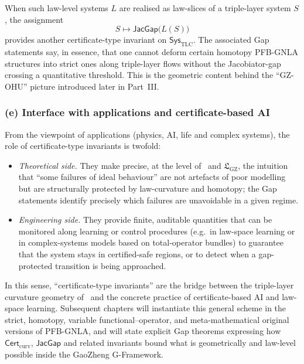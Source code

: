 \documentclass[11pt]{book}
\theoremstyle{plain}
\theoremstyle{definition}
\newcommand{\GZLS}{\ensuremath{\mathfrak{L}_{\mathrm{GZ}}}}       \newcommand{\GZLT}{\ensuremath{M_{!w}}}                           \newcommand{\GZLOC}{\ensuremath{A_M}}                             \newcommand{\GZLCurv}{\ensuremath{\mathcal{F}_{\mathrm{law}}}}
\begin{document}
When such law-level systems $L$ are realised as law-slices of a
triple-layer system $S$, the assignment
\[
   S \longmapsto \mathsf{JacGap}\bigl(L(S)\bigr)
\]
provides another certificate-type invariant on
$\mathsf{Sys}_{\mathrm{TLC}}$. The associated Gap statements say, in
essence, that one cannot deform certain homotopy PFB-GNLA structures
into strict ones along triple-layer flows without the Jacobiator-gap
crossing a quantitative threshold. This is the geometric content
behind the “GZ-OHU” picture introduced later in Part~III.



\subsubsection*{(e) Interface with applications and certificate-based AI}

From the viewpoint of applications (physics, AI, life and complex systems), the role of
certificate-type invariants is twofold:

\begin{itemize}
  \item \emph{Theoretical side.}
        They make precise, at the level of \GZTLC\ and \GZLS, the
        intuition that “some failures of ideal behaviour” are not
        artefacts of poor modelling but are structurally protected by
        law-curvature and homotopy; the Gap statements identify
        precisely which failures are unavoidable in a given regime.
  \item \emph{Engineering side.}
        They provide finite, auditable quantities that can be monitored
        along learning or control procedures (e.g.\ in law-space
        learning or in complex-systems models based on
        total-operator bundles) to guarantee
        that the system stays in certified-safe regions, or to detect
        when a gap-protected transition is being approached.
\end{itemize}

In this sense, “certificate-type invariants” are the bridge between the
triple-layer curvature geometry of \GZTLC\ and the concrete practice of
certificate-based AI and law-space learning. Subsequent chapters will
instantiate this general scheme in the strict, homotopy, variable
functional–operator, and meta-mathematical original versions of
PFB-GNLA, and will state explicit Gap theorems expressing how
$\mathsf{Cert}_{\mathrm{curv}}$, $\mathsf{JacGap}$ and related
invariants bound what is geometrically and law-level possible inside
the GaoZheng G-Framework.
\end{document}
